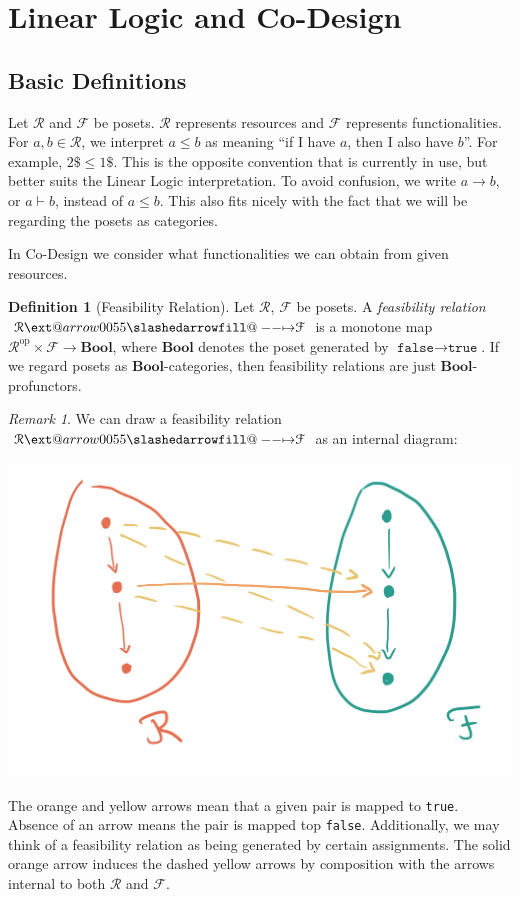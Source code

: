 \documentclass[12pt]{article}
\makeatletter
\theoremstyle{definition}
\newtheorem{definition}{Definition}[section]
\theoremstyle{plain}
\theoremstyle{plain}
\theoremstyle{plain}
\theoremstyle{plain}
\theoremstyle{remark}
\theoremstyle{remark}
\newtheorem{remark}{Remark}[section]
\newcommand{\mc}[1]{\mathcal{#1}}
\def\slashedarrowfill@#1#2#3#4#5{%
	$\m@th\thickmuskip0mu\medmuskip\thickmuskip\thinmuskip\thickmuskip
	\relax#5#1\mkern-7mu%
	\cleaders\hbox{$#5\mkern-2mu#2\mkern-2mu$}\hfill
	\mathclap{#3}\mathclap{#2}%
	\cleaders\hbox{$#5\mkern-2mu#2\mkern-2mu$}\hfill
	\mkern-7mu#4$%
}
\def\rightslashedarrowfill@{%
	\slashedarrowfill@\relbar\relbar\mapstochar\rightarrow}
\newcommand\xslashedrightarrow[2][]{%
	\ext@arrow 0055{\rightslashedarrowfill@}{#1}{#2}}
\makeatother
\begin{document}
\section{Linear Logic and Co-Design}

\subsection{Basic Definitions} \label{basic defs}

Let $\mc{R}$ and $\mc{F}$ be posets. $\mc{R}$ represents resources and $\mc{F}$ represents functionalities. For $a,b \in \mc{R}$, we interpret $a \leq b$ as meaning ``if I have $a$, then I also have $b$''. For example, $2\$ \leq 1\$$. This is the opposite convention that is currently in use, but better suits the Linear Logic interpretation. To avoid confusion, we write $a \rightarrow b$, or $a \vdash b$, instead of $a \leq b$. This also fits nicely with the fact that we will be regarding the posets as categories. 

In Co-Design we consider what functionalities we can obtain from given resources.
\begin{definition}[Feasibility Relation]
	Let $\mc{R}$, $\mc{F}$ be posets. A \emph{feasibility relation} $\mc{R} \xslashedrightarrow{} \mc{F}$ is a monotone map $\mc{R}^\text{op} \times \mc{F} \rightarrow \mathbf{Bool}$, where $\mathbf{Bool}$ denotes the poset generated by $\texttt{false} \rightarrow \texttt{true}$. If we regard posets as $\mathbf{Bool}$-categories, then feasibility relations are just $\mathbf{Bool}$-profunctors.
\end{definition}

\begin{remark}
	We can draw a feasibility relation $\mc{R} \xslashedrightarrow{} \mc{F}$ as an internal diagram:
	\begin{center}
		\includegraphics[width=\textwidth/2]{section2/feas_internal-1}
	\end{center}
	The orange and yellow arrows mean that a given pair is mapped to \texttt{true}. Absence of an arrow means the pair is mapped top \texttt{false}. Additionally, we may think of a feasibility relation as being generated by certain assignments. The solid orange arrow induces the dashed yellow arrows by composition with the arrows internal to both $\mc{R}$ and $\mc{F}$. 
\end{remark}
\end{document}
